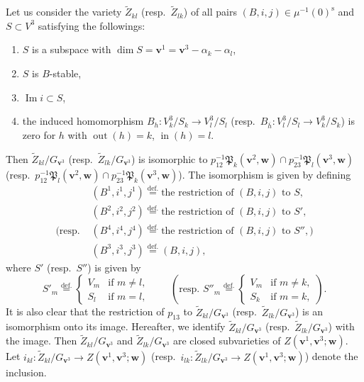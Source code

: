 \documentclass[12pt]{amsart}
\def\frak{\mathfrak}
\renewcommand{\labelenumi}{(\theenumi)}%
\newenvironment{aenume}{%
  \begin{enumerate}%
  \renewcommand{\theenumi}{\alph{enumi}}%
  \renewcommand{\labelenumi}{(\theenumi)}%
  }{\end{enumerate}}
\theoremstyle{definition}
\theoremstyle{remark}
\numberwithin{equation}{subsection}
\newcommand{\defeq}{\overset{\operatorname{\scriptstyle def.}}{=}}
\newcommand{\Ima}{\operatorname{Im}}
\newcommand{\vin}{\operatorname{in}} %
\newcommand{\vout}{\operatorname{out}} %
\newcommand{\bv}{{\mathbf v}} %
\newcommand{\bw}{{\mathbf w}} %
\newcommand{\Pa}{{\frak P}} %
\begin{document}
Let us consider the variety
$\widetilde Z_{kl}$ (resp.\ $\widetilde Z_{lk}$)
of all pairs $(B,i,j)\in \mu^{-1}(0)^{\operatorname{s}}$ and 
$S\subset V^3$
satisfying the followings:
\begin{aenume}
\item $S$ is a subspace with $\dim S = \bv^1 = \bv^3 -
\alpha_k - \alpha_l$,
\item $S$ is $B$-stable,
\item $\Ima i \subset S$,
\item the induced homomorphism
$B_h\colon V_k^3/S_k \to V_l^3/S_l$
(resp.\ $B_{\overline{h}}\colon V_l^3/S_l \to V_k^3/S_k$) is zero for
$h$ with $\vout(h) = k$, $\vin(h) = l$.
\end{aenume}
Then $\widetilde Z_{kl}/G_{\bv^3}$
(resp.\ $\widetilde Z_{lk}/G_{\bv^3}$) is isomorphic to
$
  p_{12}^{-1}\Pa_k(\bv^2,\bw) \cap p_{23}^{-1}\Pa_{l}(\bv^3,\bw)
$
(resp.\ 
$
  p_{12}^{-1}\Pa_{l}(\bv^2,\bw) \cap p_{23}^{-1}\Pa_{k}(\bv^3,\bw)
$).
The isomorphism is given by defining
\begin{align*}
  & (B^1,i^1,j^1) \defeq \text{the restriction
                               of $(B,i,j)$ to $S$},\\
  & (B^2,i^2,j^2) \defeq \text{the restriction
                               of $(B,i,j)$ to $S'$},\\
   \Big(\text{resp.\ }
  & (B^4,i^4,j^4) \defeq \text{the restriction
                               of $(B,i,j)$ to $S''$},\Big)\\
  & (B^3,i^3,j^3) \defeq (B,i,j),
\end{align*}
where $S'$ (resp.\ $S''$) is given by
\begin{equation*}
  S'_m \defeq
  \begin{cases}
     V_m &\text{if $m\neq l$,}\\
     S_l &\text{if $m = l$},
  \end{cases}
\qquad\left(\text{resp.\ }
  S''_m \defeq
  \begin{cases}
     V_m &\text{if $m\neq k$,}\\
     S_k &\text{if $m = k$},
  \end{cases}
\right).
\end{equation*}
It is also clear that the restriction of
$p_{13}$ to
$
  \widetilde Z_{kl}/G_{\bv^3}
$
(resp.\ 
$
  \widetilde Z_{lk}/G_{\bv^3}
$)
is an isomorphism onto its image.
Hereafter, we identify
$
  \widetilde Z_{kl}/G_{\bv^3}
$
(resp.\ 
$
  \widetilde Z_{lk}/G_{\bv^3}
$)
with the image. Then
$
  \widetilde Z_{kl}/G_{\bv^3}
$
and
$
  \widetilde Z_{lk}/G_{\bv^3}
$
are closed subvarieties of $Z(\bv^1,\bv^3;\bw)$.
Let
$i_{kl}\colon \widetilde Z_{kl}/G_{\bv^3}\to Z(\bv^1,\bv^3;\bw)$
(resp.\ 
$i_{lk}\colon \widetilde Z_{lk}/G_{\bv^3}\to Z(\bv^1,\bv^3;\bw)$)
denote the inclusion.
\end{document}

